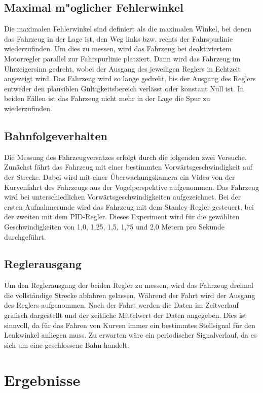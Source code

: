 \documentclass[arbeit=studie,oneside,BCOR=12mm]{ArbeitRST}
\begin{document}
\subsection{Maximal m"oglicher Fehlerwinkel}

Die maximalen Fehlerwinkel sind definiert als die maximalen Winkel, bei denen
das Fahrzeug in der Lage ist, den Weg links bzw. rechts der Fahrspurlinie
wiederzufinden. Um dies zu messen, wird das Fahrzeug bei deaktiviertem
Motorregler parallel zur Fahrspurlinie platziert. Dann wird das Fahrzeug
im Uhrzeigersinn gedreht, wobei der Ausgang des jeweiligen Reglers in Echtzeit
angezeigt wird. Das Fahrzeug wird so lange gedreht, bis der Ausgang des Reglers
entweder den plausiblen Gültigkeitsbereich verlässt oder konstant Null ist.
In beiden Fällen ist das Fahrzeug nicht mehr in der Lage die Spur zu wiederzufinden.

\subsection{Bahnfolgeverhalten}

Die Messung des Fahrzeugversatzes erfolgt durch die folgenden zwei Versuche.
Zunächst fährt das Fahrzeug mit einer bestimmten Vorwärtsgeschwindigkeit auf
der Strecke. Dabei wird mit einer Überwachungskamera ein Video von der
Kurvenfahrt des Fahrzeugs aus der Vogelperspektive aufgenommen. Das Fahrzeug
wird bei unterschiedlichen Vorwärtsgeschwindigkeiten aufgezeichnet. Bei der
ersten Aufnahmerunde wird das Fahrzeug mit dem Stanley-Regler gesteuert, bei
der zweiten mit dem PID-Regler. Dieses Experiment wird für die gewählten
Geschwindigkeiten von 1,0, 1,25, 1,5, 1,75 und 2,0 Metern pro Sekunde
durchgeführt.

\subsection{Reglerausgang}

Um den Reglerausgang der beiden Regler zu messen, wird das Fahrzeug dreimal die 
vollständige Strecke abfahren gelassen. Während der Fahrt wird der
Ausgang des Reglers aufgenommen. Nach der Fahrt werden die Daten im Zeitverlauf
grafisch dargestellt und der zeitliche Mittelwert der Daten angegeben.
Dies ist sinnvoll, 
da für das Fahren von Kurven immer ein bestimmtes Stellsignal für den Lenkwinkel anliegen muss. 
Zu erwarten wäre ein periodischer Signalverlauf, da es sich um eine geschlossene Bahn handelt.

\section{Ergebnisse}
\end{document}
